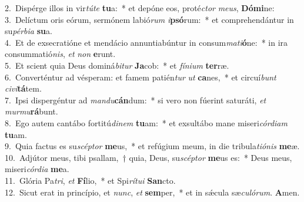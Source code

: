 {2.~}Dispérge illos in vir\textit{tú}\textit{te} \textbf{tu}a:~* et depóne eos, proté\textit{ctor} \textit{me}\textit{us}, \textbf{Dó}\textbf{mi}ne:\\
{3.~}Delíctum oris eórum, sermónem labió\textit{rum} \textit{i}\textbf{psó}rum:~* et comprehendántur in su\textit{pér}\textit{bi}\textit{a} \textbf{su}a.\\
{4.~}Et de exsecratióne et mendácio annuntiabúntur in consum\textit{ma}\textit{ti}\textbf{ó}ne:~* in ira consummatió\textit{nis}, \textit{et} \textit{non} \textbf{e}runt.\\
{5.~}Et scient quia Deus dominá\textit{bi}\textit{tur} \textbf{Ja}cob:~* et \textit{fí}\textit{ni}\textit{um} \textbf{ter}ræ.\\
{6.~}Converténtur ad vésperam: et famem patién\textit{tur} \textit{ut} \textbf{ca}nes,~* et circuí\textit{bunt} \textit{ci}\textit{vi}\textbf{tá}tem.\\
{7.~}Ipsi dispergéntur ad \textit{man}\textit{du}\textbf{cán}dum:~* si vero non fúerint saturáti, \textit{et} \textit{mur}\textit{mu}\textbf{rá}bunt.\\
{8.~}Ego autem cantábo fortitú\textit{di}\textit{nem} \textbf{tu}am:~* et exsultábo mane miseri\textit{cór}\textit{di}\textit{am} \textbf{tu}am.\\
{9.~}Quia factus es su\textit{scép}\textit{tor} \textbf{me}us,~* et refúgium meum, in die tribula\textit{ti}\textit{ó}\textit{nis} \textbf{me}æ.\\
{10.~}Adjútor meus, tibi psallam,~† quia, Deus, su\textit{scép}\textit{tor} \textbf{me}us es:~* Deus meus, miseri\textit{cór}\textit{di}\textit{a} \textbf{me}a.\\
{11.~}Glória Pa\textit{tri}, \textit{et} \textbf{Fí}lio,~* et Spi\textit{rí}\textit{tu}\textit{i} \textbf{San}cto.\\
{12.~}Sicut erat in princípio, et \textit{nunc}, \textit{et} \textbf{sem}per,~* et in sǽcula sæ\textit{cu}\textit{ló}\textit{rum}. \textbf{A}men.\\
